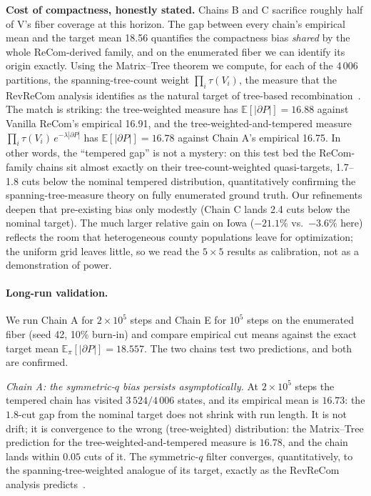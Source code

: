 \documentclass[11pt]{article}
\newcommand{\E}{\mathbb{E}}
\begin{document}
\textbf{Cost of compactness, honestly stated.} Chains B and C
sacrifice roughly half of V's fiber coverage at this horizon. The
gap between every chain's empirical mean and the target mean 18.56
quantifies the compactness bias \emph{shared} by the whole
ReCom-derived family, and on the enumerated fiber we can identify its
origin exactly. Using the Matrix--Tree theorem we compute, for each
of the 4\,006 partitions, the spanning-tree-count weight
$\prod_i \tau(V_i)$, the measure that the RevReCom analysis
identifies as the natural target of tree-based
recombination~\cite{cannon2022spanning,autry2023metropolized}. The
match is striking: the tree-weighted measure has
$\E[|\partial P|] = 16.88$ against Vanilla ReCom's empirical 16.91,
and the tree-weighted-and-tempered measure
$\prod_i \tau(V_i)\, e^{-\lambda|\partial P|}$ has
$\E[|\partial P|] = 16.78$ against Chain A's empirical 16.75. In
other words, the ``tempered gap'' is not a mystery: on this test bed
the ReCom-family chains sit almost exactly on their
tree-count-weighted quasi-targets, 1.7--1.8 cuts below the nominal
tempered distribution, quantitatively confirming the
spanning-tree-measure theory on fully enumerated ground truth. Our
refinements deepen that pre-existing bias only modestly (Chain C
lands 2.4 cuts below the nominal target). The much larger relative
gain on Iowa ($-21.1\%$ vs.\ $-3.6\%$ here) reflects the room that
heterogeneous county populations leave for optimization; the uniform
grid leaves little, so we read the $5 \times 5$ results as
calibration, not as a demonstration of power.

\paragraph{Long-run validation.}\label{sec:exp-longrun}
We run Chain A for $2 \times 10^5$ steps and Chain E for $10^5$ steps
on the enumerated fiber (seed 42, 10\% burn-in) and compare empirical
cut means against the exact target mean
$\E_\pi[|\partial P|] = 18.557$. The two chains test two predictions,
and both are confirmed.

\emph{Chain A: the symmetric-$q$ bias persists asymptotically.} At
$2 \times 10^5$ steps the tempered chain has visited $3\,524/4\,006$
states, and its empirical mean is $16.73$: the $1.8$-cut gap from the
nominal target does not shrink with run length. It is not drift; it is
convergence to the wrong (tree-weighted) distribution: the
Matrix--Tree prediction for the tree-weighted-and-tempered measure is
$16.78$, and the chain lands within $0.05$ cuts of it. The
symmetric-$q$ filter converges, quantitatively, to the
spanning-tree-weighted analogue of its target, exactly as the
RevReCom analysis predicts~\cite{cannon2022spanning}.
\end{document}
